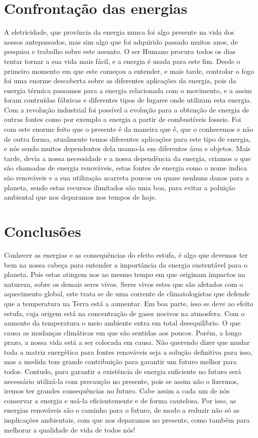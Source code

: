 \documentclass{report}
\begin{document}
\chapter{Confrontação das energias}
A eletricidade, que província da energia nunca foi algo presente na vida dos nossos antepassados, mas sim algo que foi adquirido passado muitos anos, de pesquisa e trabalho sobre este assunto. O ser Humano procura todos os dias tentar tornar a sua vida mais fácil, e a energia é usada para este fim. 
Desde o primeiro momento em que este começou a entender, e mais tarde, controlar o fogo foi uma enorme descoberta sobre as diferentes aplicações da energia, pois da energia térmica passamos para a energia relacionada com o movimento, e a assim foram contruídas fábricas e diferentes tipos de lugares onde utilizam esta energia. Com a revolução industrial foi possível a evolução para a obtenção de energia de outras fontes como por exemplo a energia a partir de combustíveis fosseis. Foi com este enorme feito que o presente é da maneira que é, que o conhecemos e não de outra forma, atualmente temos diferentes aplicações para este tipo de energia, e nós sendo muitos dependentes dela usamo-la em diferentes área e objetos.
Mais tarde, devia a nossa necessidade e a nossa dependência da energia, criamos o que são chamadas de energia renováveis, estas fontes de energia como o nome indica são renováveis e a sua utilização acarreta poucos ou quase nenhuns danos para a planeta, sendo estas recursos ilimitados são uma boa, para evitar a poluição ambiental que nos deparamos nos tempos de hoje. 



\chapter{Conclusões}
\label{chap.conclusao}
Conhecer as energias e as consequências do efeito estufa, é algo que devemos ter bem na nossa cabeça para entender a importância da energia sustentável para o planeta. Pois estas atingem nos ao mesmo tempo em que originam impactos na natureza, sobre os demais seres vivos.
Seres vivos estes que são afetados com o aquecimento global, este trata se de uma corrente de climatologistas que defende que a temperatura na Terra está a aumentar. Em boa parte, isso se deve ao efeito estufa, cuja origem está na concentração de gases nocivos na atmosfera. Com o aumento da temperatura o meio ambiente entra em total desequilíbrio. O que causa as mudanças climáticas em que são sentidas aos poucos. Porém, a longo prazo, a nossa vida está a ser colocada em causa. Não querendo dizer que mudar toda a matriz energética para fontes renováveis seja a solução definitiva para isso, mas a medida tem grande contribuição para garantir um futuro melhor para todos.
Contudo, para garantir a existência de energia suficiente no futuro será necessário utilizá-la com precaução no presente, pois se assim não o fizermos, iremos ter grandes consequências no futuro. Cabe assim a cada um de nós conservar a energia e usá-la eficientemente e de forma cautelosa. Por isso, as energias renováveis são o caminho para o futuro, de modo a reduzir não só as implicações ambientais, com que nos deparamos no presente, como também para melhorar a qualidade de vida de todos nós! 
\end{document}

